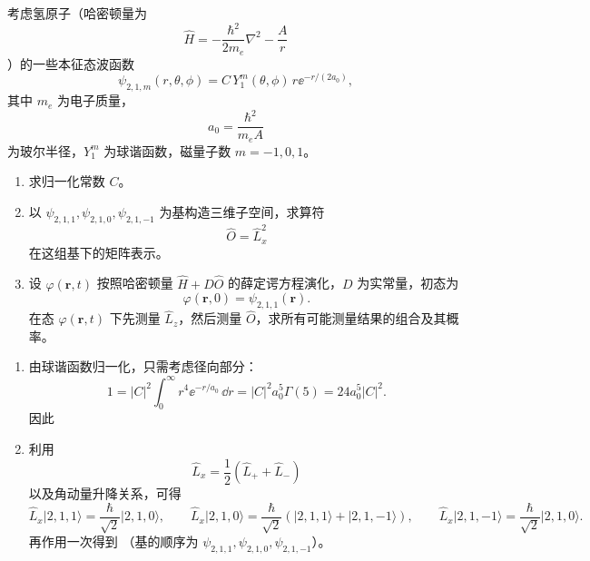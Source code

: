\begin{question}
考虑氢原子（哈密顿量为
\[
\hat H=-\frac{\hbar^2}{2m_e}\nabla^2-\frac{A}{r}
\]
）的一些本征态波函数
\[
\psi_{2,1,m}(r,\theta,\phi)=C\,Y_1^m(\theta,\phi)\,r \ee^{-r/(2a_0)},
\]
其中 $m_e$ 为电子质量，
\[
a_0=\frac{\hbar^2}{m_eA}
\]
为玻尔半径，$Y_1^m$ 为球谐函数，磁量子数 $m=-1,0,1$。

\begin{enumerate}[label=(\arabic*),leftmargin=2.5em]
  \item 求归一化常数 $C$。
  \item 以 $\psi_{2,1,1},\psi_{2,1,0},\psi_{2,1,-1}$ 为基构造三维子空间，求算符
  \[
  \hat O=\hat L_x^2
  \]
  在这组基下的矩阵表示。
  \item 设 $\varphi(\mathbf r,t)$ 按照哈密顿量 $\hat H+D\hat O$ 的薛定谔方程演化，$D$ 为实常量，初态为
  \[
  \varphi(\mathbf r,0)=\psi_{2,1,1}(\mathbf r).
  \]
  在态 $\varphi(\mathbf r,t)$ 下先测量 $\hat L_z$，然后测量 $\hat O$，求所有可能测量结果的组合及其概率。
\end{enumerate}

\begin{solution}
\begin{enumerate}[label=(\arabic*),leftmargin=2.5em]
  \item 由球谐函数归一化，只需考虑径向部分：
  \[
  1=|C|^2\int_0^{\infty}r^4\ee^{-r/a_0}\,\dd{r}
  =|C|^2 a_0^5\Gamma(5)=24a_0^5|C|^2.
  \]
  因此

  \item 利用
  \[
  \hat L_x=\frac12(\hat L_++\hat L_-)
  \]
  以及角动量升降关系，可得
  \[
  \hat L_x\lvert 2,1,1\rangle=\frac{\hbar}{\sqrt2}\lvert 2,1,0\rangle,
  \qquad
  \hat L_x\lvert 2,1,0\rangle=\frac{\hbar}{\sqrt2}(\lvert 2,1,1\rangle+\lvert 2,1,-1\rangle),
  \qquad
  \hat L_x\lvert 2,1,-1\rangle=\frac{\hbar}{\sqrt2}\lvert 2,1,0\rangle.
  \]
  再作用一次得到
  （基的顺序为 $\psi_{2,1,1},\psi_{2,1,0},\psi_{2,1,-1}$）。


\end{enumerate}
\end{solution}
\end{question}
